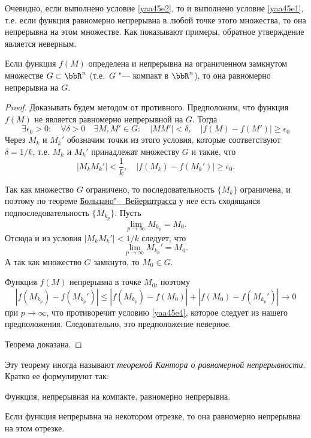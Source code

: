 Очевидно, если выполнено условие \eqref{yaa45e2}, то и выполнено условие \eqref{yaa45e1}, т.е. если функция равномерно непрерывна в любой точке этого множества, то она непрерывна на этом множестве. Как показывают примеры, обратное утверждение является неверным.

\begin{thm}
Если функция $f(M)$ определена и непрерывна на ограниченном замкнутом множестве $G\subset\bbR^n$ (т.е.~$G$ "--- компакт в $\bbR^n$), то она равномерно непрерывна на $G$.
\end{thm}

\begin{proof}
Доказывать будем методом от противного. Предположим, что функция $f(M)$ не является равномерно непрерывной на $G$. Тогда
$$
\exists\epsilon_0>0:\quad\forall\delta>0\quad\exists M,M'\in G:\quad |MM'|<\delta, \quad |f(M)-f(M')|\ge \epsilon_0
$$
Через $M_k$ и $M_k'$ обозначим точки из этого условия, которые соответствуют $\delta=1/k$, т.е. $M_k$ и $M_k'$ принадлежат множеству $G$ и такие, что 
\begin{equation}\label{yaa45e4}
|M_kM_k'|<\frac{1}{k},\quad|f(M_k)-f(M_k')|\ge \epsilon_0.
\end{equation}

Так как множество $G$ ограничено, то последовательность $\{M_k\}$ ограничена, и поэтому по теореме \hyperref[ch1:th:TBV]{Больцано"--~Вейерштрасса} у нее есть сходящаяся подпоследовательность $\{M_{k_p}\}$. Пусть
$$
\lim\limits_{p\to\infty} M_{k_p} =M_0.
$$
Отсюда и из условия $|M_kM_k'|<1/k$ следует, что 
$$
\lim\limits_{p\to\infty} M_{k_p}' =M_0.
$$
А так как множество $G$ замкнуто, то $M_0 \in G$.

Функция $f(M)$ непрерывна в точке $M_0$, поэтому
$$
|f(M_{k_p})-f(M_{k_p}')|\le |f(M_{k_p})-f(M_0)|+|f(M_0)-f(M_{k_p}')|\to 0
$$
при $p\to\infty$, что противоречит условию \eqref{yaa45e4}, которое следует из нашего предположения. Следовательно, это предположение неверное. 

Теорема доказана.
\end{proof}

Эту теорему иногда называют \textit{теоремой Кантора о равномерной непрерывности}. Кратко ее формулируют так:

\begin{thmn}
Функция, непрерывная на компакте, равномерно непрерывна.
\end{thmn}

\begin{cons}
Если функция непрерывна на некотором отрезке, то она равномерно непрерывна на этом отрезке. 
\end{cons}















